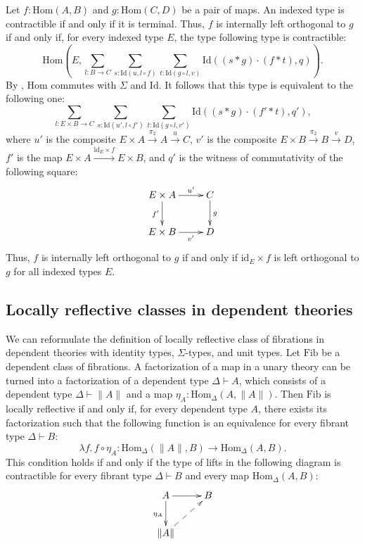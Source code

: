 \documentclass[reqno]{mscs}
\newcommand{\ob}{}
\newcommand{\fs}[1]{\mathrm{#1}}
\newcommand{\Hom}{\fs{Hom}}
\newcommand{\Id}{\fs{Id}}
\newcommand{\id}{\fs{id}}
\newcommand{\Fib}{\fs{Fib}}
\numberwithin{figure}{section}
\begin{document}
Let $f : \Hom(A,B)$ and $g : \Hom(C,D)$ be a pair of maps.
An indexed type is contractible if and only if it is terminal.
Thus, $f$ is internally left orthogonal to $g$ if and only if, for every indexed type $E$, the type following type is contractible:
\[ \Hom(E,\sum_{l : B \to C} \sum_{s : \Id(u, l \circ f)} \sum_{t : \Id(g \circ l, v)} \Id((s * g) \cdot (f * t), q)). \]
By , $\Hom$ commutes with $\Sigma$ and $\Id$.
It follows that this type is equivalent to the following one:
\[ \sum_{l : E \times B \to C} \sum_{s : \Id(u', l \circ f')} \sum_{t : \Id(g \circ l, v')} \Id((s * g) \cdot (f' * t), q'), \]
where $u'$ is the composite $E \times A \xrightarrow{\pi_2} A \xrightarrow{u} C$, $v'$ is the composite $E \times B \xrightarrow{\pi_2} B \xrightarrow{v} D$, $f'$ is the map $E \times A \xrightarrow{\id_E \times f} E \times B$,
and $q'$ is the witness of commutativity of the following square:
\[ \xymatrix{ E \times A \ar[r]^-{u'} \ar[d]_{f'}   & C \ar[d]^g \\
              E \times B \ar[r]_-{v'}               & D
            } \]
Thus, $f$ is internally left orthogonal to $g$ if and only if $\id_E \times f$ is left orthogonal to $g$ for all indexed types $E$.

\subsection{Locally reflective classes in dependent theories}

We can reformulate the definition of locally reflective class of fibrations in dependent theories with identity types, $\Sigma$-types, and unit types.
Let $\Fib$ be a dependent class of fibrations.
A factorization of a map in a unary theory can be turned into a factorization of a dependent type $\Delta \vdash A \ob$, which consists of a dependent type $\Delta \vdash \| A \| \ob$ and a map $\eta_A : \Hom_\Delta(A, \| A \|)$.
Then $\Fib$ is locally reflective if and only if, for every dependent type $A$, there exists its factorization such that the following function is an equivalence for every fibrant type $\Delta \vdash B \ob$:
\[ \lambda f.\, f \circ \eta_A : \Hom_\Delta(\| A \|, B) \to \Hom_\Delta(A, B). \]
This condition holds if and only if the type of lifts in the following diagram is contractible for every fibrant type $\Delta \vdash B \ob$ and every map $\Hom_\Delta(A,B)$:
\[ \xymatrix{ A \ar[r] \ar[d]_{\eta_A} & B \\
              \| A \| \ar@{-->}[ur]
            } \]
\end{document}
